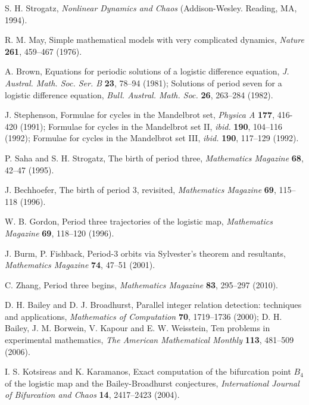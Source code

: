 \documentclass[twocolumn]{revtex4-1}
\begin{document}
\begin{thebibliography}{50}


  S. H. Strogatz,
  \textit{Nonlinear Dynamics and Chaos}
  (Addison-Wesley. Reading, MA, 1994).

  R. M. May,
  Simple mathematical models with very complicated dynamics,
  \textit{Nature}
  \textbf{261},
  459--467
  (1976).

  A. Brown,
  Equations for periodic solutions of a logistic difference equation,
  \textit{J. Austral. Math. Soc. Ser. B}
  \textbf{23},
  78--94
  (1981);
  Solutions of period seven for a logistic difference equation,
  \textit{Bull. Austral. Math. Soc.}
  \textbf{26},
  263--284
  (1982).

  J. Stephenson,
  Formulae for cycles in the Mandelbrot set,
  \textit{Physica A}
  \textbf{177},
  416-420
  (1991);
  Formulae for cycles in the Mandelbrot set II,
  \textit{ibid.}
  \textbf{190},
  104--116
  (1992);
  Formulae for cycles in the Mandelbrot set III,
  \textit{ibid.}
  \textbf{190},
  117--129
  (1992).

  P. Saha and S. H. Strogatz,
  The birth of period three,
  \textit{Mathematics Magazine}
  \textbf{68},
  42--47
  (1995).

  J. Bechhoefer,
  The birth of period 3, revisited,
  \textit{Mathematics Magazine}
  \textbf{69},
  115--118
  (1996).

  W. B. Gordon,
  Period three trajectories of the logistic map,
  \textit{Mathematics Magazine}
  \textbf{69},
  118--120
  (1996).

  J. Burm, P. Fishback,
  Period-3 orbits via Sylvester's theorem and resultants,
  \textit{Mathematics Magazine}
  \textbf{74},
  47--51
  (2001).

  C. Zhang,
  Period three begins,
  \textit{Mathematics Magazine}
  \textbf{83},
  295--297
  (2010).

  D. H. Bailey and D. J. Broadhurst,
  Parallel integer relation detection: techniques and applications,
  \textit{Mathematics of Computation}
  \textbf{70},
  1719--1736
  (2000);
  D. H. Bailey, J. M. Borwein, V. Kapour and E. W. Weisstein,
  Ten problems in experimental mathematics,
  \textit{The American Mathematical Monthly}
  \textbf{113},
  481--509
  (2006).

  I. S. Kotsireas and K. Karamanos,
  Exact computation of the bifurcation point $B_4$ of the logistic map and
    the Bailey-Broadhurst conjectures,
  \textit{International Journal of Bifurcation and Chaos}
  \textbf{14},
  2417--2423
  (2004).


\end{thebibliography}
\end{document}

